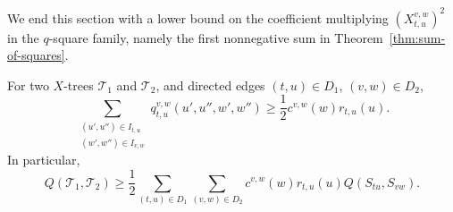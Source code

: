 \documentclass[12pt]{article}
\begin{document}
We end this section with a lower bound on the coefficient multiplying
$(X_{t,u}^{v,w})^2$ in the $q$-square family, namely the first nonnegative
sum in Theorem~\ref{thm:sum-of-squares}.

\begin{lemma}\label{lem:coefficient-lower-bound}
For two $X$-trees $\mathcal T_1$ and $\mathcal T_2$, and directed edges
$(t,u)\in D_1$, $(v,w)\in D_2$,
\begin{equation}\label{eq:display-058}
\sum_{\substack{(u',u'')\in I_{t,u}\\(w',w'')\in I_{v,w}}}
q_{t,u}^{v,w}(u',u'',w',w'')
\ge\frac12c^{v,w}(w)r_{t,u}(u).
\end{equation}
In particular,
\begin{equation}\label{eq:display-059}
Q(\mathcal T_1,\mathcal T_2)
\ge\frac12\sum_{(t,u)\in D_1}\sum_{(v,w)\in D_2}
c^{v,w}(w)r_{t,u}(u)Q(S_{tu},S_{vw}).
\end{equation}
\end{lemma}
\end{document}
